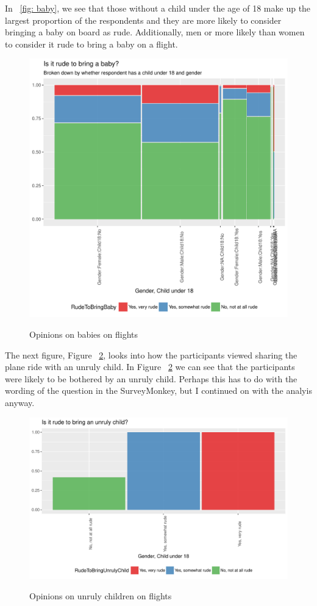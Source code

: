 \documentclass[DIV=calc, paper=a4, fontsize=10pt, twocolumn]{scrartcl}	 %
\begin{document}
\par In ~\ref{fig: baby}, we see that those without a child under the age of 18 make up the largest proportion of the respondents and they are more likely to consider bringing a baby on board as rude. Additionally, men or more likely than women to consider it rude to bring a baby on a flight.


\begin{figure}[h!]
\caption{Opinions on babies on flights}
\centering
\includegraphics{flying-baby2}
\label{fig: baby2}
\end{figure}


\par The next figure, Figure ~\ref{fig: child}, looks into how the participants viewed sharing the plane ride with an unruly child. In Figure ~\ref{fig: child} we can see that the participants were likely to be bothered by an unruly child. Perhaps this has to do with the wording of the question in the SurveyMonkey, but I continued on with the analyis anyway.



\begin{figure}[h!]
\caption{Opinions on unruly children on flights}
\centering
\includegraphics{flying-child}
\label{fig: child}
\end{figure}
\end{document}
